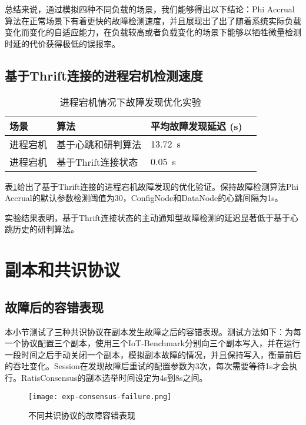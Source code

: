 总结来说，通过模拟四种不同负载的场景，我们能够得出以下结论：Phi Accrual算法在正常场景下有着更快的故障检测速度，并且展现出了出了随着系统实际负载变化而变化的自适应能力，在负载较高或者负载变化的场景下能够以牺牲微量检测时延的代价获得极低的误报率。


\subsection{基于Thrift连接的进程宕机检测速度}

\begin{table}[h!]
    \centering
    \caption{进程宕机情况下故障发现优化实验}
    \label{tab:exp-thrift-process-down}
    \begin{tabular}{@{}llll@{}}
        \toprule
        场景 & 算法 & 平均故障发现延迟 (s) \\
        \midrule
        进程宕机 & 基于心跳和研判算法 & \SI{13.72}{\second}  \\
        进程宕机 & 基于Thrift连接状态 & \SI{0.05}{\second}  \\
        \bottomrule
    \end{tabular}
\end{table}

表\ref{tab:exp-thrift-process-down}给出了基于Thrift连接的进程宕机故障发现的优化验证。保持故障检测算法Phi Accrual的默认参数检测阈值为30，ConfigNode和DataNode的心跳间隔为1s。

实验结果表明，基于Thrift连接状态的主动通知型故障检测的延迟显著低于基于心跳历史的研判算法。


\section{副本和共识协议}

\subsection{故障后的容错表现}

本小节测试了三种共识协议在副本发生故障之后的容错表现。测试方法如下：为每一个协议配置三个副本，使用三个IoT-Benchmark分别向三个副本写入，并在运行一段时间之后手动关闭一个副本，模拟副本故障的情况，并且保持写入，衡量前后的吞吐变化。Session在发现故障后重试的配置参数为3次，每次需要等待1s才会执行。RatisConsensus的副本选举时间设定为4s到8s之间。

\begin{figure}
    \centering
    \texttt{[image: exp-consensus-failure.png]}
    \caption{不同共识协议的故障容错表现}
    \label{fig:exp-consensus-failure}
\end{figure}


